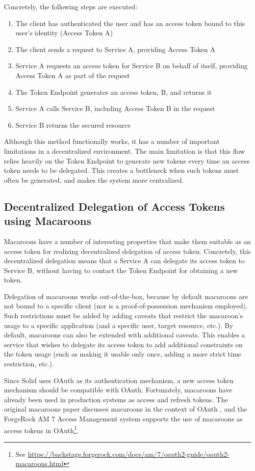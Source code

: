 \noindent Concretely, the following steps are executed:
\begin{enumerate}
    \item The client has authenticated the user and has an access token bound to this user's identity (Access Token A)
    \item The client sends a request to Service A, providing Access Token A
    \item Service A requests an access token for Service B on behalf of itself, providing Access Token A as part of the request
    \item The Token Endpoint generates an access token, B, and returns it
    \item Service A calls Service B, including Access Token B in the request
    \item Service B returns the secured resource
\end{enumerate}
\noindent Although this method functionally works, it has a number of important limitations in a decentralized environment. The main limitation is that this flow relies heavily on the Token Endpoint to generate new tokens every time an access token needs to be delegated. This creates a bottleneck when such tokens must often be generated, and makes the system more centralized. 

\newpage
\subsection{Decentralized Delegation of Access Tokens using Macaroons}
Macaroons have a number of interesting properties that make them suitable as an access token for realizing decentralized delegation of access token. Concretely, this decentralized delegation means that a Service A can delegate its access token to Service B, without having to contact the Token Endpoint for obtaining a new token.

Delegation of macaroons works out-of-the-box, because by default macaroons are not bound to a specific client (nor is a proof-of-possession mechanism employed). Such restrictions must be added by adding caveats that restrict the macaroon's usage to a specific application (and a specific user, target resource, etc.). By default, macaroons can also be extended with additional caveats. This enables a service that wishes to delegate its access token to add additional constraints on the token usage (such as making it usable only once, adding a more strict time restriction, etc.).

Since Solid uses OAuth as its authentication mechanism, a new access token mechanism should be compatible with OAuth. Fortunately, macaroons have already been used in production systems as access and refresh tokens. The original macaroons paper discusses macaroons in the context of OAuth \citep[p.12]{macaroons}, and the ForgeRock AM 7 Access Management system supports the use of macaroons as access tokens in OAuth\footnote{See \url{https://backstage.forgerock.com/docs/am/7/oauth2-guide/oauth2-macaroons.html}}.

